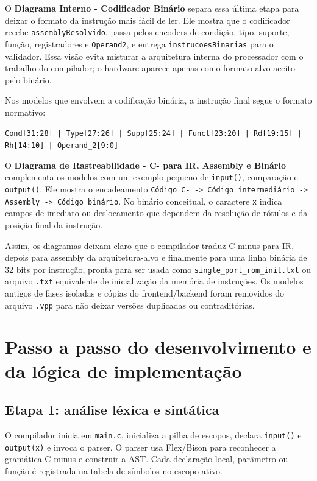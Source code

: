 \documentclass[12pt,a4paper]{article}
\begin{document}
O \textbf{Diagrama Interno - Codificador Binário} separa essa última etapa para deixar o formato da instrução mais fácil de ler. Ele mostra que o codificador recebe \texttt{assemblyResolvido}, passa pelos encoders de condição, tipo, suporte, função, registradores e \texttt{Operand2}, e entrega \texttt{instrucoesBinarias} para o validador. Essa visão evita misturar a arquitetura interna do processador com o trabalho do compilador; o hardware aparece apenas como formato-alvo aceito pelo binário.

Nos modelos que envolvem a codificação binária, a instrução final segue o formato normativo:
\begin{center}
\texttt{Cond[31:28] | Type[27:26] | Supp[25:24] | Funct[23:20] | Rd[19:15] | Rh[14:10] | Operand\_2[9:0]}
\end{center}

O \textbf{Diagrama de Rastreabilidade - C- para IR, Assembly e Binário} complementa os modelos com um exemplo pequeno de \texttt{input()}, comparação e \texttt{output()}. Ele mostra o encadeamento \texttt{Código C- -> Código intermediário -> Assembly -> Código binário}. No binário conceitual, o caractere \texttt{x} indica campos de imediato ou deslocamento que dependem da resolução de rótulos e da posição final da instrução.

Assim, os diagramas deixam claro que o compilador traduz C-minus para IR, depois para assembly da arquitetura-alvo e finalmente para uma linha binária de 32 bits por instrução, pronta para ser usada como \texttt{single\_port\_rom\_init.txt} ou arquivo \texttt{.txt} equivalente de inicialização da memória de instruções. Os modelos antigos de fases isoladas e cópias do frontend/backend foram removidos do arquivo \texttt{.vpp} para não deixar versões duplicadas ou contraditórias.

\section{Passo a passo do desenvolvimento e da lógica de implementação}
\subsection{Etapa 1: análise léxica e sintática}
O compilador inicia em \texttt{main.c}, inicializa a pilha de escopos, declara \texttt{input()} e \texttt{output(x)} e invoca o parser. O parser usa Flex/Bison para reconhecer a gramática C-minus e construir a AST. Cada declaração local, parâmetro ou função é registrada na tabela de símbolos no escopo ativo.
\end{document}
